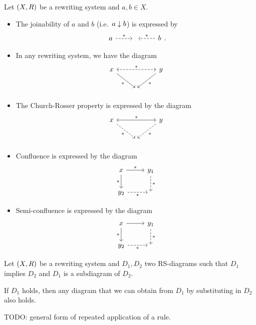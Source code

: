 \begin{example}
Let $\sSet{X,R}$ be a rewriting system and $a,b\in X$.
\begin{itemize}
\item The joinability of $a$ and $b$ (i.e.\ $a\mathrel{\downarrow} b$) is expressed by
\[ \begin{tikzcd}
a \arrow[r, dashed, "{*}"] & {} & b \arrow[l, dashed, swap, "{*}"]
\end{tikzcd}. \]
\item In any rewriting system, we have the diagram
\[ \begin{tikzcd}
x \arrow[rr, dashed, leftrightarrow, "{*}"] \arrow[dr, swap, "{*}"] & {} & y \arrow[dl, "{*}"] \\
{} & {} & {}
\end{tikzcd} \]
\item The Church-Rosser property is expressed by the diagram
\[ \begin{tikzcd}
x \arrow[rr, leftrightarrow, "{*}"] \arrow[dr, swap, dashed, "{*}"] & {} & y \arrow[dl, dashed, "{*}"] \\
{} & {} & {}
\end{tikzcd} \]
\item Confluence is expressed by the diagram
\[ \begin{tikzcd}
x \arrow[r, "{*}"] \arrow[d, swap, "{*}"] & y_1 \arrow[d, dashed, "{*}"] \\
y_2 \arrow[r, dashed, swap, "{*}"] & {}
\end{tikzcd} \]
\item Semi-confluence is expressed by the diagram
\[ \begin{tikzcd}
x \arrow[r] \arrow[d, swap, "{*}"] & y_1 \arrow[d, dashed, "{*}"] \\
y_2 \arrow[r, dashed, swap, "{*}"] & {}
\end{tikzcd} \]
\end{itemize}
\end{example}

\begin{proposition} \label{inductionRSdiagrams}
Let $\sSet{X,R}$ be a rewriting system and $D_1, D_2$ two RS-diagrams such that $D_1$ implies $D_2$ and $D_1$ is a subdiagram of $D_2$.

If $D_1$ holds, then any diagram that we can obtain from $D_1$ by substituting in $D_2$ also holds.
\end{proposition}

TODO: general form of repeated application of a rule.

